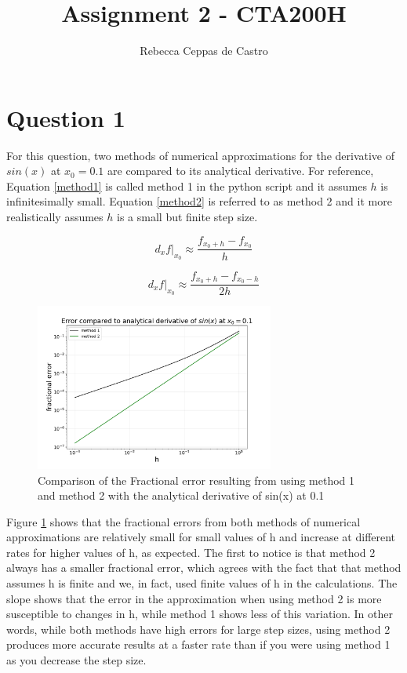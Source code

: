 \documentclass[10pt, preprint]{aastex}
\title{Assignment 2 - CTA200H}
\author{Rebecca Ceppas de Castro}
\begin{document}
\maketitle

\section*{Question 1}

For this question, two methods of numerical approximations for the derivative of $sin(x)$ at $x_0 = 0.1$ are compared to its analytical derivative. For reference, Equation \ref{method1} is called method 1 in the python script and it assumes $h$ is infinitesimally small. Equation \ref{method2} is referred to as method 2 and it more realistically assumes $h$ is a small but finite step size.

\begin{equation}\label{method1}
    d_xf|_{x_0} \approx \frac{f_{x_0 + h} - f_{x_0}}{h}
\end{equation}

\begin{equation}\label{method2}
    d_xf|_{x_0} \approx \frac{f_{x_0 + h} - f_{x_0 - h}}{2h}
\end{equation}

\begin{figure}[h]
    \centering
    \includegraphics[width=0.7\textwidth]{derivatives.pdf}
    \caption{Comparison of the Fractional error resulting from using method 1 and method 2 with the analytical derivative of sin(x) at 0.1}
    \label{derivatives}
\end{figure}

Figure \ref{derivatives} shows that the fractional errors from both methods of numerical approximations are relatively small for small values of h and increase at different rates for higher values of h, as expected. The first to notice is that method 2 always has a smaller fractional error, which agrees with the fact that that method assumes h is finite and we, in fact, used finite values of h in the calculations. The slope shows that the error in the approximation when using method 2 is more susceptible to changes in h, while method 1 shows less of this variation. In other words, while both methods have high errors for large step sizes, using method 2 produces more accurate results at a faster rate than if you were using method 1 as you decrease the step size.
\end{document}
